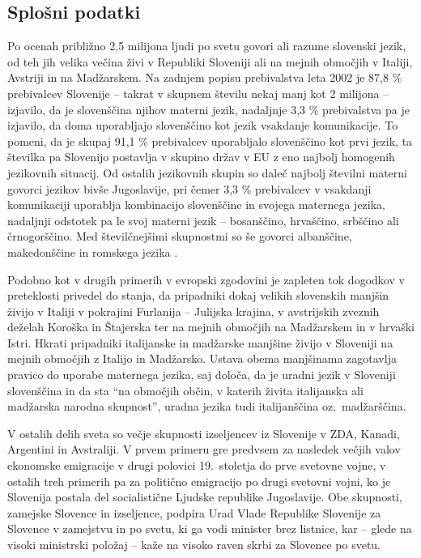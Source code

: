 \begin{multicols}{2}

\subsection{Splošni podatki}

Po ocenah približno 2,5 mili\-jona ljudi po svetu go\-vo\-ri ali razume slovenski jezik, od teh jih velika večina živi v Republiki Sloveniji ali na mejnih območjih v Italiji, Avstriji in na Madžarskem. Na zadnjem popisu prebivalstva leta 2002 je 87,8 \% prebivalcev Slovenije – takrat v skupnem številu nekaj manj kot 2 mili\-jona – izjavilo, da je slovenščina njihov materni jezik, nadaljnje 3,3 \% prebivalstva pa je izjavilo, da doma uporab\-ljajo slovenščino kot jezik vsakdanje komunikacije. To po\-meni, da je skupaj 91,1 \% prebivalcev uporab\-ljalo slovenščino kot prvi jezik, ta številka pa Slovenijo postav\-lja v skupino držav v EU z eno naj\-bolj homogenih jezikovnih situacij. Od ostalih jezikovnih skupin so daleč naj\-bolj številni materni go\-vorci jezikov bivše Jugoslavije, pri čemer 3,3 \% prebivalcev v vsakdanji komunikaciji uporab\-lja kombinacijo slovenščine in svojega maternega jezika, nadaljnji odstotek pa le svoj materni jezik – bosanščino, hrvaščino, srbščino ali črnogorščino. Med številčnejšimi skupnostmi so še go\-vorci albanščine, makedonščine in romskega jezika \cite{SURS1}.

Podobno kot v drugih primerih v evropski zgodovini je zapleten tok dogodkov v preteklosti privedel do stanja, da pripadniki dokaj velikih slovenskih manj\-šin živijo v Italiji v pokrajini Furlanija -- Julijska krajina, v avstrijskih zveznih deželah Koroška in Štajerska ter na mejnih območjih na Madžarskem in v hrvaški Istri. Hkrati pripadniki itali\-janske in mad\-žarske manjšine živijo v Sloveniji na mejnih območjih z Italijo in Madžarsko. Ustava obema manjšinama zagotav\-lja pravico do uporabe maternega jezika, saj določa, da je uradni jezik v Sloveniji slovenščina in da sta “na območjih občin, v katerih živita itali\-janska ali madžarska narodna skupnost”, uradna jezika tudi itali\-janščina oz.~madžarščina.

V ostalih delih sveta so večje skupnosti izseljencev iz Slovenije v ZDA, Kanadi, Argentini in Avstra\-liji. V prvem primeru gre predvsem za nasledek večjih valov ekonomske emigracije v drugi polovici 19.~stoletja do prve svetovne vojne, v ostalih treh primerih pa za politično emigracijo po drugi svetovni vojni, ko je Slovenija postala del socialistične Ljudske republike Jugoslavije. Obe skupnosti, zamejske Slovence in izseljence, podpira Urad Vlade Republike Slovenije za Slovence v zamejstvu in po svetu, ki ga vodi minister brez listnice, kar – glede na visoki ministrski položaj – kaže na visoko raven skrbi za Slovence po svetu.


\end{multicols}
